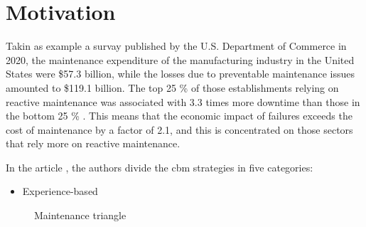 \section{Motivation}
\label{sec:motivation}

Takin as example a survay published by the U.S. Department of Commerce in 2020, the maintenance expenditure of the manufacturing industry in the United States were \$57.3 billion, while the losses due to preventable maintenance issues amounted to \$119.1 billion. The top 25 \% of those 
establishments relying on reactive maintenance was associated with 3.3 times more downtime 
than those in the bottom 25 \% \cite{NIST}. This means that the economic impact of failures exceeds the cost of maintenance by a factor of 2.1, and this is concentrated on those sectors that rely more on reactive maintenance.

In the article \cite{Maintenance_cat}, the authors divide the \gls{cbm} strategies in five categories:
\begin{itemize}
    \item Experience-based 
\end{itemize}

\begin{figure}
    \centering
    
    \caption{Maintenance triangle \cite{Maintenance_cat}}
    \label{fig:MaintTriangle}
\end{figure} 